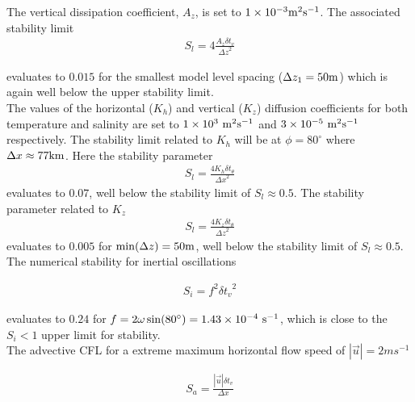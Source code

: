 \noindent The vertical dissipation coefficient, $A_{z}$, is set to 
$1\times10^{-3} {\rm m}^2{\rm s}^{-1}$. The associated stability limit
\begin{eqnarray}
\label{EQ:eg-hs-laplacian_stability_z}
S_{l} = 4 \frac{A_{z} \delta t_{v}}{{\Delta z}^2}
\end{eqnarray}

\noindent evaluates to $0.015$ for the smallest model
level spacing ($\Delta z_{1}=50{\rm m}$) which is again well below
the upper stability limit.
\\

The values of the horizontal ($K_h$) and vertical ($K_{z}$) diffusion coefficients 
for both temperature and salinity are set to $1 \times 10^{3}~{\rm m}^{2}{\rm s}^{-1}$ 
and $3 \times 10^{-5}~{\rm m}^{2}{\rm s}^{-1}$ respectively. The stability limit 
related to $K_h$ will be at $\phi=80^{\circ}$ where $\Delta x \approx 77 {\rm km}$. 
Here the stability parameter 
\begin{eqnarray} 
\label{EQ:eg-hs-laplacian_stability_xtheta}
S_{l} = \frac{4 K_h \delta t_{\theta}}{{\Delta x}^2} 
\end{eqnarray}
evaluates to $0.07$, well below the stability limit of $S_{l} \approx 0.5$. The 
stability parameter related to $K_{z}$
\begin{eqnarray} 
\label{EQ:eg-hs-laplacian_stability_ztheta}
S_{l} = \frac{4 K_{z} \delta t_{\theta}}{{\Delta z}^2} 
\end{eqnarray}
evaluates to $0.005$ for $\min(\Delta z)=50{\rm m}$, well below the stability limit 
of $S_{l} \approx 0.5$.
\\

\noindent The numerical stability for inertial oscillations
\cite{adcroft:95} 

\begin{eqnarray}
\label{EQ:eg-hs-inertial_stability}
S_{i} = f^{2} {\delta t_v}^2
\end{eqnarray}

\noindent evaluates to $0.24$ for $f=2\omega\sin(80^{\circ})=1.43\times10^{-4}~{\rm s}^{-1}$, which is close to 
the $S_{i} < 1$ upper limit for stability.
\\

\noindent The advective CFL \cite{adcroft:95} for a extreme maximum 
horizontal flow
speed of $ | \vec{u} | = 2 ms^{-1}$

\begin{eqnarray}
\label{EQ:eg-hs-cfl_stability}
S_{a} = \frac{| \vec{u} | \delta t_{v}}{ \Delta x}
\end{eqnarray}

